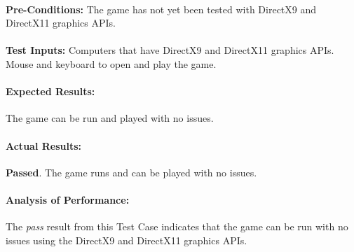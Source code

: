 \documentclass{article}
\begin{document}
    \paragraph{}\textbf{Pre-Conditions:} The game has not yet been tested with DirectX9 and DirectX11 graphics APIs.
    \paragraph{}\textbf{Test Inputs:} Computers that have DirectX9 and DirectX11 graphics APIs. Mouse and keyboard to open and play the game.
    \paragraph{Expected Results:} The game can be run and played with no issues.
    \paragraph{Actual Results:} \textbf{Passed}. The game runs and can be played with no issues.
    \paragraph{Analysis of Performance:} The \emph{pass} result from this Test Case indicates that the game can be run with no issues using the DirectX9 and DirectX11 graphics APIs.
\end{document}
